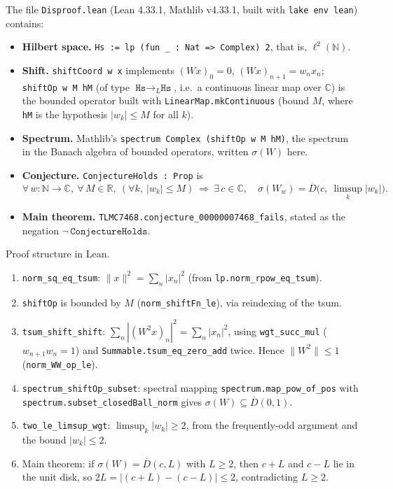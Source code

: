 \documentclass[11pt]{article}
\theoremstyle{definition}
\begin{document}
The file \texttt{Disproof.lean} (Lean 4.33.1, Mathlib v4.33.1, built with \texttt{lake env lean}) contains:
\begin{itemize}
\item \textbf{Hilbert space.} \texttt{Hs := lp (fun \_ : Nat => Complex) 2}, that is, $\ell^2(\mathbb{N})$.
\item \textbf{Shift.} \texttt{shiftCoord w x} implements $(Wx)_0=0$, $(Wx)_{n+1}=w_nx_n$;
\texttt{shiftOp w M hM} (of type $\texttt{Hs}\to_L\texttt{Hs}$, i.e.\ a continuous linear map over $\mathbb{C}$)
is the bounded operator built with \texttt{LinearMap.mkContinuous} (bound $M$, where
\texttt{hM} is the hypothesis $|w_k|\le M$ for all $k$).
\item \textbf{Spectrum.} Mathlib's \texttt{spectrum Complex (shiftOp w M hM)}, the spectrum in the Banach algebra
of bounded operators, written $\sigma(W)$ here.
\item \textbf{Conjecture.} \texttt{ConjectureHolds : Prop} is
\[
\forall\, w\colon\mathbb{N}\to\mathbb{C},\ \forall\, M\in\mathbb{R},\ (\forall k,\ |w_k|\le M)\ \Rightarrow\
\exists\, c\in\mathbb{C},\quad \sigma(W_w)=\overline{D}\Big(c,\ \limsup_k |w_k|\Big).
\]
\item \textbf{Main theorem.} \texttt{TLMC7468.conjecture\_00000007468\_fails}, stated as the negation
$\neg\,\texttt{ConjectureHolds}$.
\end{itemize}

Proof structure in Lean.
\begin{enumerate}
\item \texttt{norm\_sq\_eq\_tsum}: $\|x\|^2=\sum_n|x_n|^2$ (from \texttt{lp.norm\_rpow\_eq\_tsum}).
\item \texttt{shiftOp} is bounded by $M$ (\texttt{norm\_shiftFn\_le}), via reindexing of the tsum.
\item \texttt{tsum\_shift\_shift}: $\sum_n|(W^2x)_n|^2=\sum_n|x_n|^2$, using \texttt{wgt\_succ\_mul}
($w_{n+1}w_n=1$) and \texttt{Summable.tsum\_eq\_zero\_add} twice. Hence $\|W^2\|\le 1$ (\texttt{norm\_WW\_op\_le}).
\item \texttt{spectrum\_shiftOp\_subset}: spectral mapping \texttt{spectrum.map\_pow\_of\_pos} with
\texttt{spectrum.subset\_closedBall\_norm} gives $\sigma(W)\subseteq\overline{D}(0,1)$.
\item \texttt{two\_le\_limsup\_wgt}: $\limsup_k|w_k|\ge 2$, from the frequently-odd argument
and the bound $|w_k|\le 2$.
\item Main theorem: if $\sigma(W)=\overline{D}(c,L)$ with $L\ge 2$, then $c+L$ and $c-L$ lie in the unit disk,
so $2L=|(c+L)-(c-L)|\le 2$, contradicting $L\ge 2$.
\end{enumerate}
\end{document}
